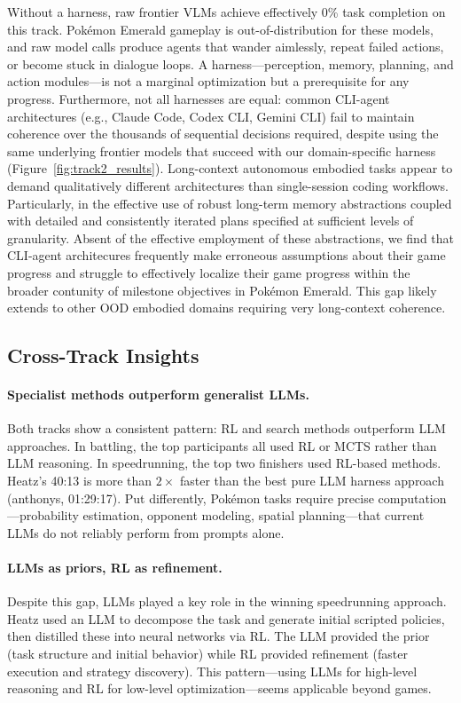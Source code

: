 Without a harness, raw frontier VLMs achieve effectively 0\% task completion on this track. Pokémon Emerald gameplay is out-of-distribution for these models, and raw model calls produce agents that wander aimlessly, repeat failed actions, or become stuck in dialogue loops. A harness---perception, memory, planning, and action modules---is not a marginal optimization but a prerequisite for any progress. Furthermore, not all harnesses are equal: common CLI-agent architectures (e.g., Claude Code, Codex CLI, Gemini CLI) fail to maintain coherence over the thousands of sequential decisions required, despite using the same underlying frontier models that succeed with our domain-specific harness (Figure~\ref{fig:track2_results}). Long-context autonomous embodied tasks appear to demand qualitatively different architectures than single-session coding workflows. Particularly, in the effective use of robust long-term memory abstractions coupled with detailed and consistently iterated plans specified at sufficient levels of granularity. Absent of the effective employment of these abstractions, we find that CLI-agent architecures frequently make erroneous assumptions about their game progress and struggle to effectively localize their game progress within the broader contunity of milestone objectives in Pokémon Emerald. This gap likely extends to other OOD embodied domains requiring very long-context coherence.

\subsection{Cross-Track Insights}

\paragraph{Specialist methods outperform generalist LLMs.} Both tracks show a consistent pattern: RL and search methods outperform LLM approaches. In battling, the top participants all used RL or MCTS rather than LLM reasoning. In speedrunning, the top two finishers used RL-based methods. Heatz's 40:13 is more than $2\times$ faster than the best pure LLM harness approach (anthonys, 01:29:17). Put differently, Pokémon tasks require precise computation---probability estimation, opponent modeling, spatial planning---that current LLMs do not reliably perform from prompts alone.

\paragraph{LLMs as priors, RL as refinement.} Despite this gap, LLMs played a key role in the winning speedrunning approach. Heatz used an LLM to decompose the task and generate initial scripted policies, then distilled these into neural networks via RL. The LLM provided the prior (task structure and initial behavior) while RL provided refinement (faster execution and strategy discovery). This pattern---using LLMs for high-level reasoning and RL for low-level optimization---seems applicable beyond games.

